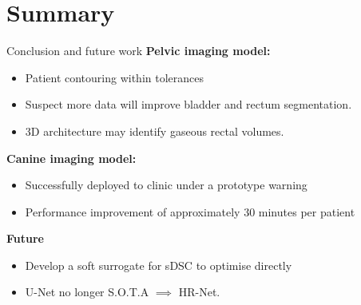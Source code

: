 \documentclass[9pt]{beamer}
\begin{document}
\section{Summary}
\begin{frame}{Conclusion and future work}
\textbf{Pelvic imaging model:}
\begin{itemize}
	\item Patient contouring within tolerances
	\item Suspect more data will improve bladder and rectum segmentation.
	\item 3D architecture may identify gaseous rectal volumes.

  \end{itemize}
  \vspace{4mm}

 \textbf{Canine imaging model:}
 \begin{itemize}
  \item Successfully deployed to clinic under a prototype warning
  \item Performance improvement of approximately 30 minutes per patient
\end{itemize}
\vspace{4mm}

\textbf{Future}
\begin{itemize}
\item Develop a soft surrogate for sDSC to optimise directly
\item U-Net no longer S.O.T.A $\implies$ HR-Net.\footnotemark[16]
\end{itemize}
\end{frame}
%
\end{document}
